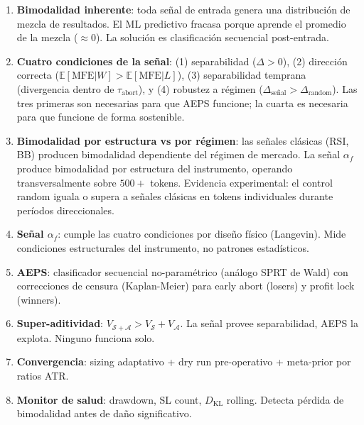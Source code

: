 \documentclass[11pt,a4paper]{article}
\newcommand{\E}{\mathbb{E}}
\newcommand{\KL}{D_{\mathrm{KL}}}
\newcommand{\af}{\alpha_f}
\begin{document}
\begin{tcolorbox}[keybox, title=Arquitectura Te\'orica Completa]
\begin{enumerate}[leftmargin=1.5em]
\item \textbf{Bimodalidad inherente}: toda se\~nal de entrada genera
  una distribuci\'on de mezcla de resultados. El ML predictivo
  fracasa porque aprende el promedio de la mezcla ($\approx 0$).
  La soluci\'on es clasificaci\'on secuencial post-entrada.

\item \textbf{Cuatro condiciones de la se\~nal}: (1) separabilidad
  ($\Delta > 0$), (2) direcci\'on correcta ($\E[\text{MFE}|W] > \E[\text{MFE}|L]$),
  (3) separabilidad temprana (divergencia dentro de $\tau_{\text{abort}}$),
  y (4) robustez a r\'egimen ($\Delta_{\text{se\~nal}} > \Delta_{\text{random}}$).
  Las tres primeras son necesarias para que AEPS funcione; la cuarta
  es necesaria para que funcione de forma sostenible.

\item \textbf{Bimodalidad por estructura vs por r\'egimen}: las
  se\~nales cl\'asicas (RSI, BB) producen bimodalidad dependiente
  del r\'egimen de mercado. La se\~nal $\af$ produce bimodalidad
  por estructura del instrumento, operando transversalmente sobre
  $500+$ tokens. Evidencia experimental: el control random iguala o
  supera a se\~nales cl\'asicas en tokens individuales durante
  per\'iodos direccionales.

\item \textbf{Se\~nal $\af$}: cumple las cuatro condiciones por
  dise\~no f\'isico (Langevin). Mide condiciones estructurales del
  instrumento, no patrones estad\'isticos.

\item \textbf{AEPS}: clasificador secuencial no-param\'etrico
  (an\'alogo SPRT de Wald) con correcciones de censura (Kaplan-Meier)
  para early abort (losers) y profit lock (winners).

\item \textbf{Super-aditividad}: $V_{\mathcal{S}+\mathcal{A}} >
  V_{\mathcal{S}} + V_{\mathcal{A}}$. La se\~nal provee separabilidad,
  AEPS la explota. Ninguno funciona solo.

\item \textbf{Convergencia}: sizing adaptativo + dry run pre-operativo
  + meta-prior por ratios ATR.

\item \textbf{Monitor de salud}: drawdown, SL count, $\KL$ rolling.
  Detecta p\'erdida de bimodalidad antes de da\~no significativo.
\end{enumerate}
\end{tcolorbox}
\end{document}
